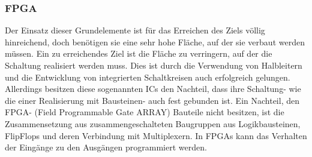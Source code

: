 \documentclass[conference]{IEEEtran}
\begin{document}
\subsubsection{FPGA}
Der Einsatz dieser Grundelemente ist für das Erreichen des Ziels völlig hinreichend, doch benötigen sie eine sehr hohe Fläche, auf der sie verbaut werden müssen. Ein zu erreichendes Ziel ist die Fläche zu verringern, auf der die Schaltung realisiert werden muss. Dies ist durch die Verwendung von Halbleitern und die Entwicklung von integrierten Schaltkreisen auch erfolgreich gelungen. Allerdings besitzen diese sogenannten ICs den Nachteil, dass ihre Schaltung- wie die einer Realisierung mit Bausteinen- auch fest gebunden ist. Ein Nachteil, den FPGA- (Field Programmable Gate ARRAY) Bauteile nicht besitzen, ist die Zusammensetzung aus zusammengeschalteten Baugruppen aus Logikbausteinen, FlipFlops und deren Verbindung mit Multiplexern. In FPGAs kann das Verhalten der Eingänge zu den Ausgängen programmiert werden.
\end{document}
